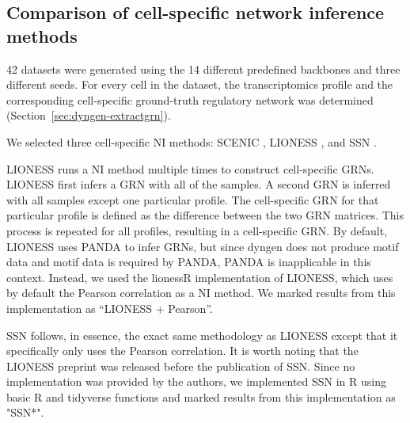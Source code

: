\documentclass[
  table,
  10pt,
  a4paper]{article}
\begin{document}
\hypertarget{sec:dyngen-nicompare}{%
\subsection{Comparison of cell-specific network inference
methods}\label{sec:dyngen-nicompare}}

42 datasets were generated using the 14 different predefined backbones
and three different seeds. For every cell in the dataset, the
transcriptomics profile and the corresponding cell-specific ground-truth
regulatory network was determined (Section~\ref{sec:dyngen-extractgrn}).

We selected three cell-specific NI methods: SCENIC
\autocite{aibar_scenicsinglecellregulatory_2017}, LIONESS
\autocite{kuijjer_estimatingsamplespecificregulatory_2015,kuijjer_estimatingsamplespecificregulatory_2019},
and SSN \autocite{liu_personalizedcharacterizationdiseases_2016}.

LIONESS \autocite{kuijjer_estimatingsamplespecificregulatory_2019} runs
a NI method multiple times to construct cell-specific GRNs. LIONESS
first infers a GRN with all of the samples. A second GRN is inferred
with all samples except one particular profile. The cell-specific GRN
for that particular profile is defined as the difference between the two
GRN matrices. This process is repeated for all profiles, resulting in a
cell-specific GRN. By default, LIONESS uses PANDA
\autocite{glass_passingmessagesbiological_2013} to infer GRNs, but since
dyngen does not produce motif data and motif data is required by PANDA,
PANDA is inapplicable in this context. Instead, we used the lionessR
\autocite{kuijjer_lionessrsinglesample_2019} implementation of LIONESS,
which uses by default the Pearson correlation as a NI method. We marked
results from this implementation as ``LIONESS + Pearson''.

SSN \autocite{liu_personalizedcharacterizationdiseases_2016} follows, in
essence, the exact same methodology as LIONESS except that it
specifically only uses the Pearson correlation. It is worth noting that
the LIONESS preprint was released before the publication of SSN. Since
no implementation was provided by the authors, we implemented SSN in R
using basic R and tidyverse functions
\autocite{wickham_welcometidyverse_2019} and marked results from this
implementation as "SSN*".
\end{document}
